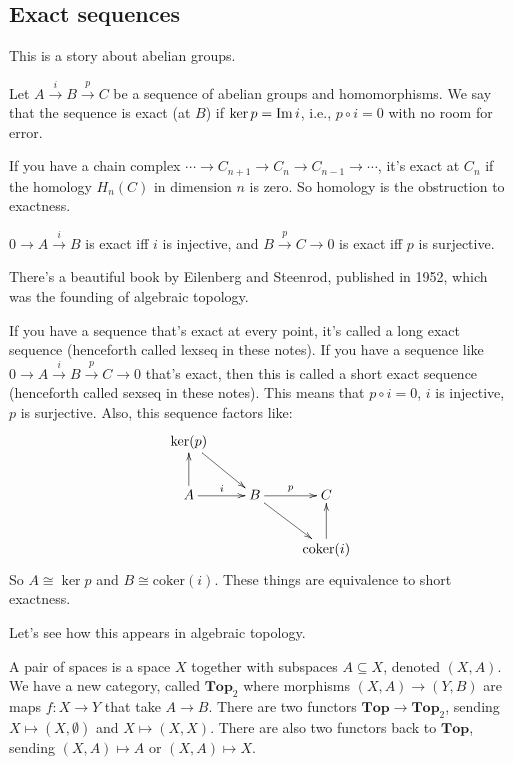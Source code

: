 \subsection{Exact sequences}
This is a story about abelian groups.
\begin{definition}
Let $A\xrightarrow{i} B\xrightarrow{p} C$ be a sequence of abelian groups and homomorphisms. We say that the sequence is exact (at $B$) if $\ker p=\operatorname{Im} i$, i.e., $p\circ i=0$ with no room for error.
\end{definition}
\begin{example}
If you have a chain complex $\cdots\to C_{n+1}\to C_n\to C_{n-1}\to\cdots$, it's exact at $C_n$ if the homology $ H_n(C)$ in dimension $n$ is zero. So homology is the obstruction to exactness. 
\end{example}
\begin{example}
$0\to A\xrightarrow{i}B$ is exact iff $i$ is injective, and $B\xrightarrow{p}C\to 0$ is exact iff $p$ is surjective.
\end{example}
There's a beautiful book by Eilenberg and Steenrod, published in 1952, which was the founding of algebraic topology.
\begin{example}
If you have a sequence that's exact at every point, it's called a long exact sequence (henceforth called lexseq in these notes). If you have a sequence like $0\to A\xrightarrow{i} B\xrightarrow{p} C\to 0$ that's exact, then this is called a short exact sequence (henceforth called sexseq in these notes). This means that $p\circ i=0$, $i$ is injective, $p$ is surjective. Also, this sequence factors like:
	\begin{equation*}
	\xymatrix{\ker(p) \ar[dr] & & \\
	A\ar[u]\ar[r]^i & B\ar[r]^p\ar[dr] & C\\
	 & & \mathrm{coker}(i)\ar[u]}
	\end{equation*}
So $A\cong \ker p$ and $B\cong \mathrm{coker}(i)$. These things are equivalence to short exactness. 
\end{example}
Let's see how this appears in algebraic topology.
\begin{definition}
A pair of spaces is a space $X$ together with subspaces $A\subseteq X$, denoted $(X,A)$. We have a new category, called $\mathbf{Top}_2$ where morphisms $(X,A)\to (Y,B)$ are maps $f:X\to Y$ that take $A\to B$. There are two functors $\mathbf{Top}\to \mathbf{Top}_2$, sending $X\mapsto (X,\emptyset)$ and $X\mapsto (X,X)$. There are also two functors back to $\mathbf{Top}$, sending $(X,A)\mapsto A$ or $(X,A)\mapsto X$.
\end{definition}
